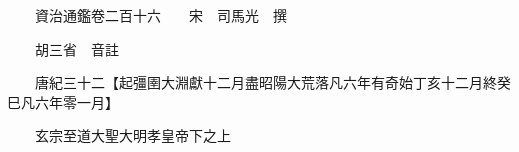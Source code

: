 










 


 
 


 

  
  
  
  
  





  
  
  
  
  
 
  

  

  
  
  



  

 
 

  
   




  

  
  


  　　資治通鑑卷二百十六　　宋　司馬光　撰

　　胡三省　音註

　　唐紀三十二【起彊圉大淵獻十二月盡昭陽大荒落凡六年有奇始丁亥十二月終癸巳凡六年零一月】

　　玄宗至道大聖大明孝皇帝下之上


